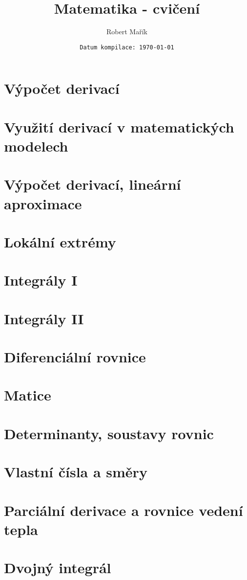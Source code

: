 \documentclass[]{report}
\title{Matematika - cvičení}
\author{Robert Mařík}
\date{\texttt{\footnotesize Datum kompilace: \today}}
\begin{document}
\maketitle

\let\figure\comment
\let\endfigure\endcomment

\setcounter{tocdepth}{0}
\tableofcontents

\chapter{Výpočet derivací}

\chapter{Využití derivací v matematických modelech}

\chapter{Výpočet derivací, lineární aproximace}

\chapter{Lokální extrémy}

\chapter{Integrály I}

\chapter{Integrály II}

\chapter{Diferenciální rovnice}

\chapter{Matice}

\chapter{Determinanty, soustavy rovnic}

\chapter{Vlastní čísla a směry}

\chapter{Parciální derivace a rovnice vedení tepla}

\chapter{Dvojný integrál}

\end{document}
